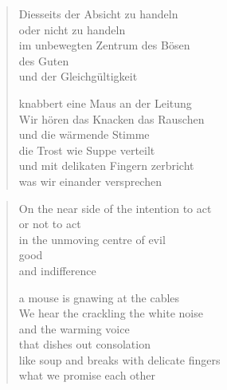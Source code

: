 
\cleartoverso

\label{nachtasyl}

\begin{verse}

Diesseits der Absicht zu handeln\\
oder nicht zu handeln\\
im unbewegten Zentrum des Bösen\\
des Guten\\
und der Gleichgültigkeit

knabbert eine Maus an der Leitung\\
Wir hören das Knacken das Rauschen\\
und die wärmende Stimme\\
die Trost wie Suppe verteilt\\
und mit delikaten Fingern zerbricht\\
was wir einander versprechen

\end{verse}

\clearpage


\begin{verse}

On the near side of the intention to act\\
or not to act\\
in the unmoving centre of evil\\
good\\
and indifference

a mouse is gnawing at the cables\\
We hear the crackling the white noise\\
and the warming voice\\
that dishes out consolation\\
like soup and breaks with delicate fingers\\
what we promise each other

\end{verse}
